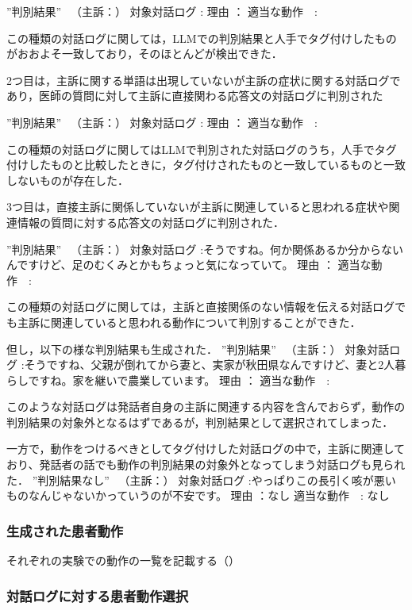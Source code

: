 ”判別結果” 　（主訴：）
  対象対話ログ  :
         理由  ：
    適当な動作　:

この種類の対話ログに関しては，LLMでの判別結果と人手でタグ付けしたものがおおよそ一致しており，そのほとんどが検出できた．

2つ目は，主訴に関する単語は出現していないが主訴の症状に関する対話ログであり，医師の質問に対して主訴に直接関わる応答文の対話ログに判別された

”判別結果” 　（主訴：）
  対象対話ログ  :
         理由  ：
    適当な動作　:

この種類の対話ログに関してはLLMで判別された対話ログのうち，人手でタグ付けしたものと比較したときに，タグ付けされたものと一致しているものと一致しないものが存在した．

3つ目は，直接主訴に関係していないが主訴に関連していると思われる症状や関連情報の質問に対する応答文の対話ログに判別された．

”判別結果” 　（主訴：）
  対象対話ログ  :そうですね。何か関係あるか分からないんですけど、足のむくみとかもちょっと気になっていて。
         理由  ：
    適当な動作　:

この種類の対話ログに関しては，主訴と直接関係のない情報を伝える対話ログでも主訴に関連していると思われる動作について判別することができた．

但し，以下の様な判別結果も生成された．
”判別結果” 　（主訴：）
  対象対話ログ  :そうですね、父親が倒れてから妻と、実家が秋田県なんですけど、妻と2人暮らしですね。家を継いで農業しています。
         理由  ：
    適当な動作　:

このような対話ログは発話者自身の主訴に関連する内容を含んでおらず，動作の判別結果の対象外となるはずであるが，判別結果として選択されてしまった．

一方で，動作をつけるべきとしてタグ付けした対話ログの中で，主訴に関連しており、発話者の話でも動作の判別結果の対象外となってしまう対話ログも見られた．
”判別結果なし” 　（主訴：）
  対象対話ログ  :やっぱりこの長引く咳が悪いものなんじゃないかっていうのが不安です。
         理由  ：なし
    適当な動作　: なし

\subsubsection*{生成された患者動作}
それぞれの実験での動作の一覧を記載する（）


\subsubsection*{対話ログに対する患者動作選択}
